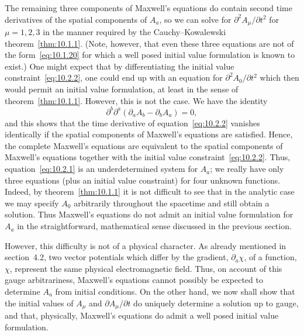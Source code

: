 The remaining three components of Maxwell's equations do contain second time
derivatives of the spatial components of \(A_a\), so we can solve for
\(\partial^2A_\mu/\partial t^2\) for \(\mu=1,2,3\) in the manner required by the
Cauchy--Kowalewski theorem~\ref{thm:10.1.1}. (Note, however, that even these
three equations are not of the form~\eqref{eq:10.1.20} for which a well posed initial
value formulation is known to exist.) One might expect that by differentiating the
initial value constraint~\eqref{eq:10.2.2}, one could end up with an equation for
\(\partial^2A_0/\partial t^2\) which then would permit an initial value formulation,
at least in the sense of theorem~\ref{thm:10.1.1}. However, this is not the case. We
have the identity
\begin{equation}
  \partial^b\partial^a(\partial_aA_b-\partial_bA_a)=0,
  \tag{10.2.6}\label{eq:10.2.6}
\end{equation}
and this shows that the time derivative of equation~\eqref{eq:10.2.2} vanishes
identically if the spatial components of Maxwell's equations are satisfied. Hence, the
complete Maxwell's equations are equivalent to the spatial components of Maxwell's
equations together with the initial value constraint~\eqref{eq:10.2.2}. Thus,
equation~\eqref{eq:10.2.1} is an underdetermined system for \(A_a\); we really have
only three equations (plus an initial value constraint) for four unknown functions.
Indeed, by theorem~\ref{thm:10.1.1} it is not difficult to see that in the analytic case
we may specify \(A_0\) arbitrarily throughout the spacetime and still obtain a solution.
Thus Maxwell's equations do not admit an initial value formulation for \(A_a\) in the
straightforward, mathematical sense discussed in the previous section.

However, this difficulty is not of a physical character. As already mentioned in
section~4.2, two vector potentials which differ by the gradient, \(\partial_a\chi\), of a
function, \(\chi\), represent the same physical electromagnetic field. Thus, on account
of this gauge arbitrariness, Maxwell's equations cannot possibly be expected to
determine \(A_a\) from initial conditions. On the other hand, we now shall show that
the initial values of \(A_\mu\) and \(\partial A_\mu/\partial t\) do uniquely determine a
solution up to gauge, and that, physically, Maxwell's equations do admit a well posed
initial value formulation.

